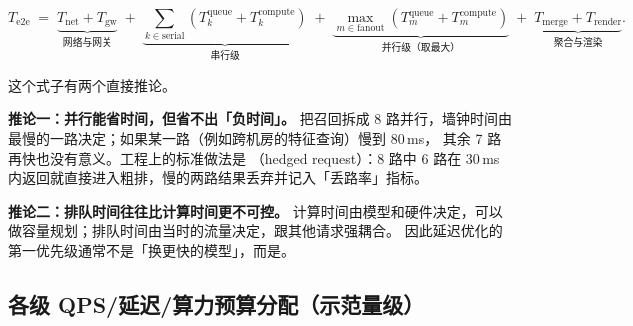 \begin{equation}
T_{\text{e2e}} \;=\; \underbrace{T_{\text{net}} + T_{\text{gw}}}_{\text{网络与网关}}
\;+\; \underbrace{\sum_{k \in \text{serial}} \left( T^{\text{queue}}_{k} + T^{\text{compute}}_{k} \right)}_{\text{串行级}}
\;+\; \underbrace{\max_{m \in \text{fanout}} \left( T^{\text{queue}}_{m} + T^{\text{compute}}_{m} \right)}_{\text{并行级（取最大）}}
\;+\; \underbrace{T_{\text{merge}} + T_{\text{render}}}_{\text{聚合与渲染}} .
\label{eq:lat-budget}
\end{equation}

这个式子有两个直接推论。

\textbf{推论一：并行能省时间，但省不出「负时间」。}
把召回拆成 8 路并行，墙钟时间由最慢的一路决定；如果某一路（例如跨机房的特征查询）慢到 80\,ms，
其余 7 路再快也没有意义。工程上的标准做法是
（hedged request）：8 路中 6 路在 30\,ms 内返回就直接进入粗排，慢的两路结果丢弃并记入「丢路率」指标。

\textbf{推论二：排队时间往往比计算时间更不可控。}
计算时间由模型和硬件决定，可以做容量规划；排队时间由当时的流量决定，跟其他请求强耦合。
因此延迟优化的第一优先级通常不是「换更快的模型」，而是。

\subsection{各级 QPS/延迟/算力预算分配（示范量级）}


